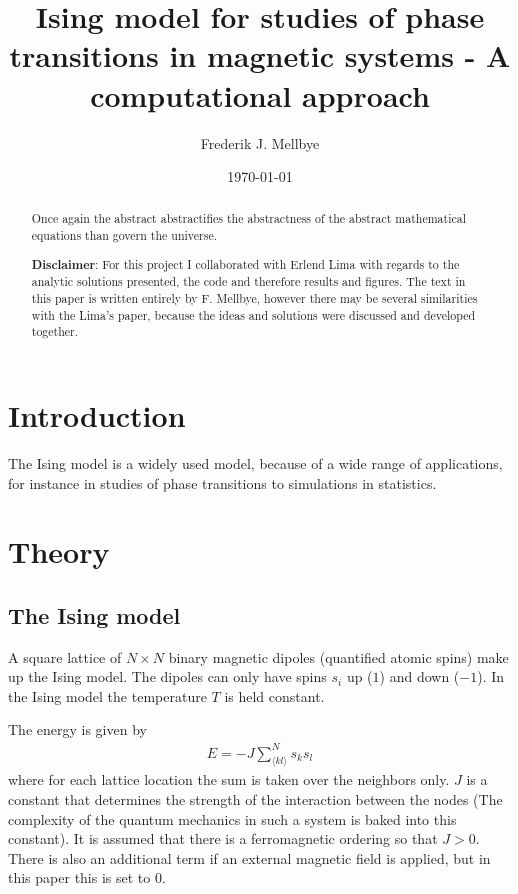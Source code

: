 \documentclass[aps,reprint]{revtex4-1}
\begin{document}
\title{Ising model for studies of phase transitions in magnetic systems - A computational approach}
\author{Frederik J. Mellbye}
\date{\today}

\begin{abstract}\noindent
Once again the abstract abstractifies the abstractness of the abstract mathematical
equations than govern the universe.

\bigskip
\noindent \textbf{Disclaimer}:
\newline
For this project I collaborated with Erlend Lima with regards to the
analytic solutions presented, the code and therefore results and figures.
The text in this paper is written entirely by F. Mellbye, however there may be
several similarities with the Lima's paper, because the ideas and solutions
were discussed and developed together.
\end{abstract}
\maketitle
\tableofcontents
\makeatletter
\let\toc@pre\relax
\let\toc@post\relax
\makeatother

\newpage

\section{Introduction} \label{sec:introduction}
The Ising model is a widely used model, because of a wide range of applications,
for instance in studies of phase transitions to simulations in statistics.
\section{Theory} \label{sec:theory}
\subsection{The Ising model}
A square lattice of $N \times N$ binary magnetic dipoles (quantified atomic spins)
make up the Ising model. The dipoles can only have spins $s_i$ up ($1$) and down ($-1$).
In the Ising model the temperature $T$ is held constant.

The energy is given by
\begin{align}\label{eq:energy}
  E = -J \sum_{\langle kl \rangle}^{N} s_k s_l
\end{align}
where for each lattice location the sum is taken over the neighbors only. $J$ is
a constant that determines the strength of the interaction between the nodes
(The complexity of the quantum mechanics in such a system is baked into
this constant). It is assumed that there is a ferromagnetic ordering so that $J > 0$.
There is also an additional term if an external magnetic field is applied, but
in this paper this is set to $0$.
\end{document}
